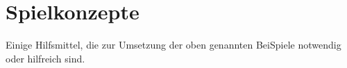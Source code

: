 \chapter{Spielkonzepte}

Einige Hilfsmittel, die zur Umsetzung der oben genannten BeiSpiele notwendig oder
hilfreich sind.


\newpage


\newpage


\newpage


\newpage


\newpage


\newpage


\newpage


\newpage


\newpage


\newpage
